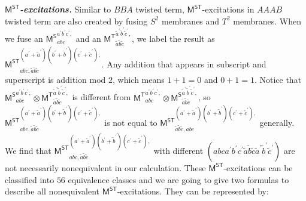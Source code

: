 \documentclass[11pt,nofootinbib,preprint]{revtex4-1}
\begin{document}
\textbf{\textit{$\mathsf{M^{ST}}$-excitations.}}
Similar to $BBA$ twisted term, $\mathsf{M^{ST}}$-excitations in $AAAB$ twisted term are also created by fusing $S^2$ membranes and  $T^2$ membranes. When we fuse an $\mathsf{M^S}_{abc}^{a^{\prime}b^{\prime}c^{\prime},}$ and an $\mathsf{M^T}_{\tilde{a}\tilde{b}\tilde{c}}^{\tilde{a}^{\prime}\tilde{b}^{\prime}\tilde{c}^{\prime},}$, we label the result as $\mathsf{M^{ST}}_{abc,\tilde{a}\tilde{b}\tilde{c}}^{\left( a^{\prime}+\tilde{a}^{\prime} \right) \left( b^{\prime}+\tilde{b}^{\prime} \right) \left( c^{\prime}+\tilde{c}^{\prime} \right),}$. Any addition that appears in subscript and superscript is addition mod $2$, which means $1+1=0$ and $0+1=1$. Notice that $\mathsf{M^S}_{abc}^{a^{\prime}b^{\prime}c^{\prime},}\otimes\mathsf{M^T}_{\tilde{a}\tilde{b}\tilde{c}}^{\tilde{a}^{\prime}\tilde{b}^{\prime}\tilde{c}^{\prime},}$ is different from $\mathsf{M^T}_{abc}^{a^{\prime}b^{\prime}c^{\prime},}\otimes \mathsf{M^S}_{\tilde{a}\tilde{b}\tilde{c}}^{\tilde{a}^{\prime}\tilde{b}^{\prime}\tilde{c}^{\prime},}$, so $\mathsf{M^{ST}}_{abc,\tilde{a}\tilde{b}\tilde{c}}^{\left( a^{\prime}+\tilde{a}^{\prime} \right) \left( b^{\prime}+\tilde{b}^{\prime} \right) \left( c^{\prime}+\tilde{c}^{\prime} \right) ,}$ is not equal to $\mathsf{M^{ST}}_{\tilde{a}\tilde{b}\tilde{c},abc}^{\left( a^{\prime}+\tilde{a}^{\prime} \right) \left( b^{\prime}+\tilde{b}^{\prime} \right) \left( c^{\prime}+\tilde{c}^{\prime} \right),}$ generally. We find that $\mathsf{M^{ST}}_{abc,\tilde{a}\tilde{b}\tilde{c}}^{\left( a^{\prime}+\tilde{a}^{\prime} \right) \left( b^{\prime}+\tilde{b}^{\prime} \right) \left( c^{\prime}+\tilde{c}^{\prime} \right),}$ with different $\left(abca^{\prime}b^{\prime}c^{\prime}\tilde{a}\tilde{b}\tilde{c}\tilde{a}^{\prime}\tilde{b}^{\prime}\tilde{c}^{\prime}\right)$ are not necessarily nonequivalent in our calculation. These $\mathsf{M^{ST}}$-excitations can be classified into $56$ equivalence classes and we are going to give two formulas to describe all nonequivalent $\mathsf{M^{ST}}$-excitations. They can be represented by:
\end{document}
